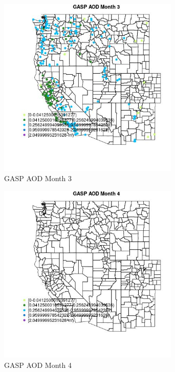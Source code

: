 \begin{figure} 
\centering  
\includegraphics[width=0.77\textwidth]{Code_Outputs/Report_ML_input_PM25_Step4_part_e_de_duplicated_aves_compiled_2019-05-18wNAs_MapObsMo3GASP_AOD.jpg} 
\caption{\label{fig:Report_ML_input_PM25_Step4_part_e_de_duplicated_aves_compiled_2019-05-18wNAsMapObsMo3GASP_AOD}GASP AOD Month 3} 
\end{figure} 
 

\clearpage 

\begin{figure} 
\centering  
\includegraphics[width=0.77\textwidth]{Code_Outputs/Report_ML_input_PM25_Step4_part_e_de_duplicated_aves_compiled_2019-05-18wNAs_MapObsMo4GASP_AOD.jpg} 
\caption{\label{fig:Report_ML_input_PM25_Step4_part_e_de_duplicated_aves_compiled_2019-05-18wNAsMapObsMo4GASP_AOD}GASP AOD Month 4} 
\end{figure} 
 

